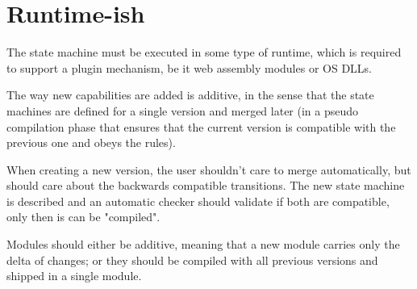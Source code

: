 \documentclass[a4paper]{article}
\begin{document}
\section*{Runtime-ish}

The state machine must be executed in some type of runtime, which is required to support
a plugin mechanism, be it web assembly modules or OS DLLs.

The way new capabilities are added is additive, in the sense that the state machines are defined
for a single version and merged later (in a pseudo compilation phase that ensures that the current version
is compatible with the previous one and obeys the rules).

When creating a new version, the user shouldn't care to merge automatically, but should care about the
backwards compatible transitions.
The new state machine is described and an automatic checker should validate if both are
compatible, only then is can be "compiled".

Modules should either be additive, meaning that a new module carries only the delta of changes;
or they should be compiled with all previous versions and shipped in a single module.



\end{document}
